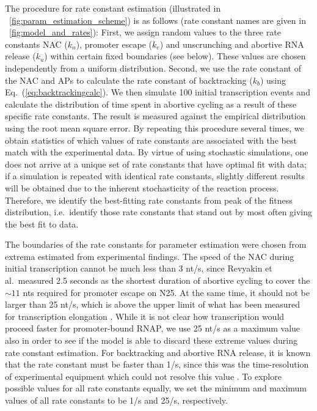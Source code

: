 The procedure for rate constant estimation (illustrated in
\FIG~\ref{fig:param_estimation_scheme}) is as follows (rate constant names
are given in \FIG~\ref{fig:model_and_rates}): First, we assign random values
to the three rate constants NAC ($k_n$), promoter escape ($k_e$) and
unscrunching and abortive RNA release ($k_u$) within certain fixed boundaries
(see below). These values are chosen independently from a uniform
distribution. Second, we use the rate constant of the NAC and APs to
calculate the rate constant of backtracking ($k_b$) using
Eq.~(\ref{eq:backtrackingcalc}). We then simulate 100 initial transcription
events and calculate the distribution of time spent in abortive cycling as a
result of these specific rate constants. The result is measured against the
empirical distribution \cite{revyakin_abortive_2006} using the root mean
square error. By repeating this procedure several times, we obtain statistics
of which values of rate constants are associated with the best match with
the experimental data. By virtue of using stochastic simulations, one does not
arrive at a unique set of rate constants that have optimal fit with data; if a
simulation is repeated with identical rate constants, slightly different
results will be obtained due to the inherent stochasticity of the reaction
process. Therefore, we identify the best-fitting rate constants from peak of
the fitness distribution, i.e.\ identify those rate constants that stand out
by most often giving the best fit to data.

The boundaries of the rate constants for parameter estimation were chosen from
extrema estimated from experimental findings. The speed of the NAC during initial
transcription cannot be much less than 3 nt/s, since Revyakin et al.\ measured
2.5 seconds as the shortest duration of abortive cycling
\cite{revyakin_abortive_2006} to cover the $\sim 11$ nts required for promoter
escape on N25. At the same time, it should not be larger than 25 nt/s,
which is above the upper limit of what has been measured for transcription
elongation \cite{bai_mechanochemical_2007}. While it is not clear how
transcription would proceed faster for promoter-bound RNAP, we use 25 nt/s as
a maximum value also in order to see if the model is able to discard these
extreme values during rate constant estimation. For backtracking and abortive
RNA release, it is known that the rate constant must be faster than 1/s, since
this was the time-resolution of experimental equipment which could not resolve
this value \cite{revyakin_abortive_2006}. To explore possible values for all
rate constants equally, we set the minimum and maximum values of all rate
constants to be 1/s and 25/s, respectively. 

